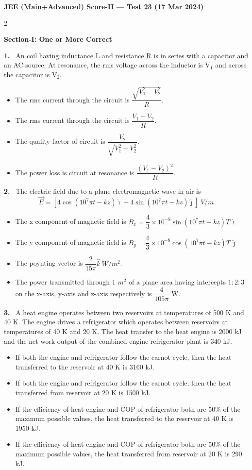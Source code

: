 \documentclass[10pt]{extarticle}
\newcommand{\partsec}[2]{\par\medskip\noindent{\large\bfseries PART-#1: #2}\par\smallskip}
\newcommand{\sect}[1]{\par\smallskip\noindent\textbf{#1}\par}
\newcommand{\qn}[1]{\par\smallskip\noindent\textbf{#1.}~}
\newenvironment{qoptions}{\begin{itemize}[leftmargin=1.8em,itemsep=1pt,topsep=2pt,label={}]}{\end{itemize}}
\newcommand{\opt}[2]{\item[(#1)] #2}
\begin{document}
\begin{center}{\Large\bfseries JEE (Main+Advanced) Score-II --- Test 23 (17 Mar 2024)}\end{center}
\begin{multicols}{2}

\partsec{1}{PHYSICS}
\sect{Section-I: One or More Correct}

\qn{1} An coil having inductance L and resistance R is in series with a capacitor and an AC source. At resonance, the rms voltage across the inductor is V$_1$ and across the capacitor is V$_2$.
\begin{qoptions}
\opt{A}{The rms current through the circuit is $\dfrac{\sqrt{V_1^2-V_2^2}}{R}$.}
\opt{B}{The rms current through the circuit is $\dfrac{V_1-V_2}{R}$.}
\opt{C}{The quality factor of circuit is $\dfrac{V_2}{\sqrt{V_1^2-V_2^2}}$.}
\opt{D}{The power loss is circuit at resonance is $\dfrac{(V_1-V_2)^2}{R}$.}
\end{qoptions}

\qn{2} The electric field due to a plane electromagnetic wave in air is
\[\vec E = \left[4\cos(10^7\pi t - kz)\hat\imath + 4\sin(10^7\pi t - kz)\hat\jmath\right]\ V/m\]
\begin{qoptions}
\opt{A}{The x component of magnetic field is $B_x = \dfrac43\times10^{-8}\sin(10^7\pi t-kz)T\,\hat\imath$}
\opt{B}{The y component of magnetic field is $B_y = \dfrac43\times10^{-8}\cos(10^7\pi t-kz)T\,\hat\jmath$}
\opt{C}{The poynting vector is $\dfrac{2}{15\pi}\hat k\ W/m^2$.}
\opt{D}{The power transmitted through 1 $m^2$ of a plane area having intercepts $1:2:3$ on the x-axis, y-axis and z-axis respectively is $\dfrac{4}{105\pi}$ W.}
\end{qoptions}

\qn{3} A heat engine operates between two reservoirs at temperatures of 500 K and 40 K. The engine drives a refrigerator which operates between reservoirs at temperatures of 40 K and 20 K. The heat transfer to the heat engine is 2000 kJ and the net work output of the combined engine refrigerator plant is 340 kJ.
\begin{qoptions}
\opt{A}{If both the engine and refrigerator follow the carnot cycle, then the heat transferred to the reservoir at 40 K is 3160 kJ.}
\opt{B}{If both the engine and refrigerator follow the carnot cycle, then the heat transferred from reservoir at 20 K is 1500 kJ.}
\opt{C}{If the efficiency of heat engine and COP of refrigerator both are 50\% of the maximum possible values, the heat transferred to the reservoir at 40 K is 1950 kJ.}
\opt{D}{If the efficiency of heat engine and COP of refrigerator both are 50\% of the maximum possible values, the heat transferred from reservoir at 20 K is 290 kJ.}
\end{qoptions}


\end{multicols}
\end{document}
